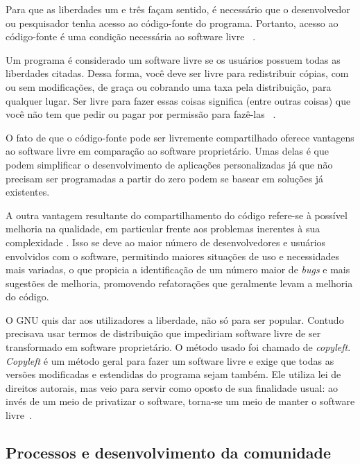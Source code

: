 Para que as liberdades um e três façam sentido, é necessário que o desenvolvedor ou pesquisador tenha acesso ao código-fonte do programa.  Portanto, acesso ao código-fonte é uma condição necessária ao software livre ~\cite{gnu2013}.

Um programa é considerado um software livre se os usuários possuem todas as liberdades citadas. Dessa forma, você deve ser livre para redistribuir cópias, com ou sem modificações, de graça ou cobrando uma taxa pela distribuição, para qualquer lugar. Ser livre para fazer essas coisas significa (entre outras coisas) que você não tem que pedir ou pagar por permissão para fazê-las ~\cite{anaPaula2012}.

O fato de que o código-fonte pode ser livremente compartilhado oferece vantagens ao software livre em comparação ao software proprietário. Umas delas é que podem simplificar o desenvolvimento de aplicações personalizadas já que não precisam ser programadas a partir do zero podem se basear em soluções já existentes.

A outra vantagem resultante do compartilhamento do código refere-se à possível melhoria na qualidade, em particular frente aos problemas inerentes à sua complexidade \cite{catedralBazzar}.
%
Isso se deve ao maior número de desenvolvedores e usuários envolvidos com o software, permitindo maiores situações de uso e necessidades mais variadas, o que propicia a identificação de um número maior de \emph{bugs} e mais sugestões de melhoria, promovendo refatorações que geralmente levam a melhoria do código.

O GNU quis dar aos utilizadores a liberdade, não só para ser popular. Contudo precisava usar termos de distribuição que impediriam software livre de ser transformado em software proprietário. O método usado foi chamado de \emph{copyleft}. \emph{Copyleft} é um método geral para fazer um software livre e exige que todas as versões modificadas e estendidas do programa sejam também. Ele utiliza lei de direitos autorais, mas veio para servir como oposto de sua finalidade usual: ao invés de um meio de privatizar o software, torna-se um meio de manter o software livre~\cite{stallman2009}.

\subsection{Processos e desenvolvimento da comunidade}
\label{proc-desenvol-comunidade}

